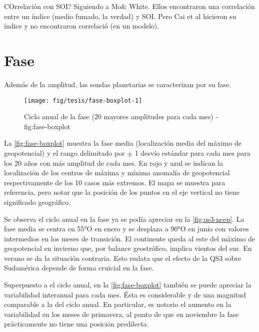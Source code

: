 \documentclass[spanish,a4paper]{book}
\begin{document}
COrrelación con SOI? Siguiendo a Mo\& White. Ellos encontraron una
correlación entre un índice (medio fumado, la verdad) y SOI. Pero Cai et
al hicieron su índice y no encontraron correlació (en un modelo).

\section{Fase}\label{fase}

Además de la amplitud, las sondas planetarias se caracterizan por su
fase. 

\begin{landscape}\begin{figure}

{\centering \texttt{[image: fig/tesis/fase-boxplot-1]} 

}

\caption{Ciclo anual de la fase (20 mayores amplitudes para cada mes) - fig:fase-boxplot}\label{fig:fase-boxplot}
\end{figure}
\end{landscape}

La \autoref{fig:fase-boxplot} muestra la fase media (localización media
del máximo de geopotencial) y el rango delimitado por \(\pm\) 1 desvío
estándar para cada mes para los 20 años con más amplitud de cada mes. En
rojo y azul se indican la localización de los centros de máxima y mínima
anomalía de geopotencial respectivamente de los 10 casos más extremos.
El mapa se muestra para referencia, pero notar que la posición de los
puntos en el eje vertical no tiene significado geográfico.

Se observa el ciclo anual en la fase ya se podía apreciar en la
\autoref{fig:qs3-ncep}. La fase media se centra en 55°O en enero y se
desplaza a 90°O en junio con valores intermedios en los meses de
transición. El continente queda al este del máximo de geopotencial en
invierno que, por balance geostrófico, implica vientos del sur. En
verano se da la situación contraria. Esto reslata que el efecto de la
QS3 sobre Sudamérica depende de forma cruicial en la fase.

Superpuesto a el ciclo anual, en la \autoref{fig:fase-boxplot} también
se puede apreciar la variabilidad interanual para cada mes. Ésta es
considerable y de una magnitud comparable a la del ciclo anual. En
particular, es notorio el aumento en la variabilidad en los meses de
primavera, al punto de que en noviembre la fase prácticamente no tiene
una posición predilecta.
\end{document}
